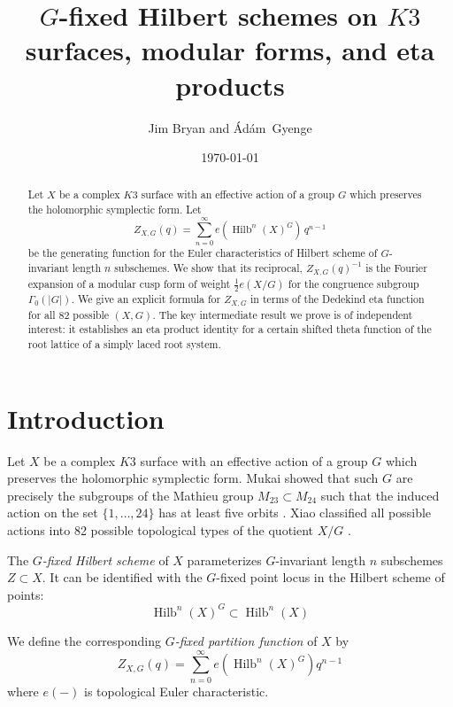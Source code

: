 \documentclass{article}
\title{$G$-fixed Hilbert schemes on $K3$ surfaces, modular forms, and
eta products}
\author{Jim Bryan and \'{A}d\'{a}m~Gyenge}
\date{\today}
\theoremstyle{definition}
\newcommand{\half}{\frac{1}{2}}
\newcommand{\Hilb}{\operatorname{Hilb}}
\begin{document}
\maketitle


\begin{abstract}
Let $X$ be a complex $K3$ surface with an effective action of a group
$G$ which preserves the holomorphic symplectic form. Let 
\[
Z_{X,G}(q) = \sum_{n=0}^{\infty} e(\Hilb^{n}(X)^{G})\, q^{n-1}
\]
be the generating function for the Euler characteristics of Hilbert
scheme of $G$-invariant length $n$ subschemes. We show that its
reciprocal, $Z_{X,G}(q)^{-1}$ is the Fourier expansion of a modular
cusp form of weight $\half e(X/G)$ for the congruence subgroup
$\Gamma_{0}(|G|)$. We give an explicit formula for $Z_{X,G}$ in terms
of the Dedekind eta function for all 82 possible $(X,G)$. The key
intermediate result we prove is of independent interest: it
establishes an eta product identity for a certain shifted theta
function of the root lattice of a simply laced root system.
\end{abstract}








\section{Introduction}

Let $X$ be a complex $K3$ surface with an effective action of a group
$G$ which preserves the holomorphic symplectic form. Mukai showed that
such $G$ are precisely the subgroups of the Mathieu group
$M_{23}\subset M_{24}$ such that the induced action on the set
$\{1,\dots ,24 \}$ has at least five orbits
\cite{mukai1988finite}. Xiao classified all possible actions into
82 possible topological types of the quotient $X/G$ \cite{xiao1996galois}.

The \emph{$G$-fixed Hilbert scheme} of $X$ parameterizes
$G$-invariant length $n$ subschemes $Z\subset X$. It can be
identified with the $G$-fixed point locus in the Hilbert scheme of
points: 
\[
\Hilb^{n}(X)^{G} \subset \Hilb^{n}(X)
\]

We define the corresponding \emph{$G$-fixed partition function} of
$X$ by
\[
Z_{X,G}(q) = \sum_{n=0}^{\infty} e\left(\Hilb^{n}(X)^{G} \right) q^{n-1} 
\]
where $e(-)$ is topological Euler characteristic.
\end{document}
